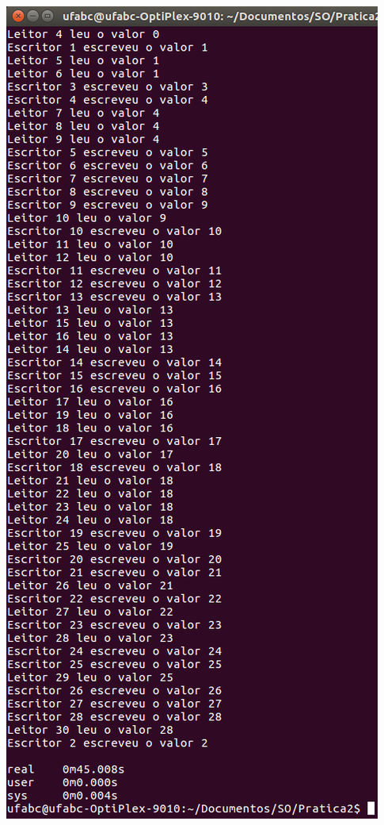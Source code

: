 \vspace{2em}
\begin{minipage}{\textwidth}
    \hspace{-1em}
    \centering
    \includegraphics[trim=0 0 0 0,clip,scale=.4]{pratica2/time-prog7.png}
    \label{prog4modpng}
    \hspace{1em}
\end{minipage}
